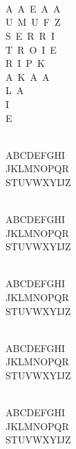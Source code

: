 \documentclass{memoir}
\begin{document}
\begin{multicols}{2}
\strut\\
\\


\\
{\huge
A~A~E~A~A\\
U~M~U~F~Z\\
S~E~R~R~I\\
T~R~O~I~E\\
R~I~P~K\\
A~K~A~A\\
L~A\\
I\\
E\\}

\\
{\miniscule
ABCDEFGHI\\
JKLMNOPQR\\
STUVWXYĲZ\\}

\\
{\tiny
ABCDEFGHI\\
JKLMNOPQR\\
STUVWXYĲZ\\}

\\
{\scriptsize
ABCDEFGHI\\
JKLMNOPQR\\
STUVWXYĲZ\\}

\\
{\footnotesize
ABCDEFGHI\\
JKLMNOPQR\\
STUVWXYĲZ\\}

\\
{\small
ABCDEFGHI\\
JKLMNOPQR\\
STUVWXYĲZ\\}


\end{multicols}
\end{document}
